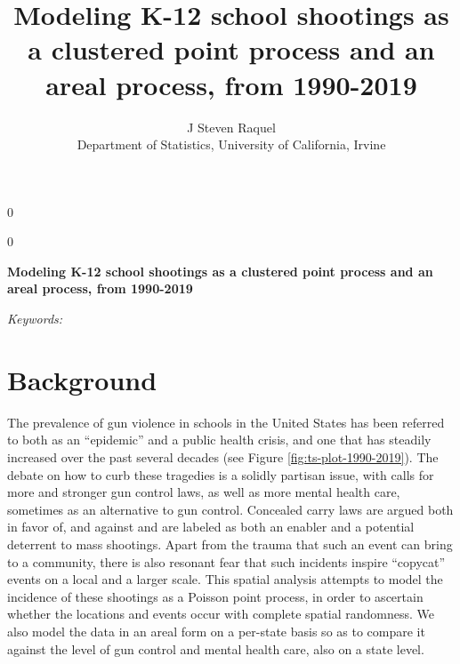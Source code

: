 \documentclass[12pt]{article}
\newcommand{\blind}{0}
\begin{document}
\def\spacingset#1{\renewcommand{\baselinestretch}%
{#1}\small\normalsize} \spacingset{1}



\blind
{
  \title{\bf Modeling K-12 school shootings as a clustered point process and an areal process, from 1990-2019}

  \author{
        J Steven Raquel \\
    Department of Statistics, University of California, Irvine\\
      }
  \maketitle
} \fi

\blind
{
  \bigskip
  \bigskip
  \bigskip
  \begin{center}
    {\LARGE\bf Modeling K-12 school shootings as a clustered point process and an areal process, from 1990-2019}
  \end{center}
  \medskip
} \fi

\bigskip
\begin{abstract}

\end{abstract}

\noindent%
{\it Keywords:} 
\vfill

\newpage
\spacingset{1.45} %

\hypertarget{background}{%
\section{Background}\label{background}}

The prevalence of gun violence in schools in the United States has been referred to both as an ``epidemic'' and a public health crisis, and one that has steadily increased over the past several decades (see Figure \ref{fig:ts-plot-1990-2019}). The debate on how to curb these tragedies is a solidly partisan issue, with calls for more and stronger gun control laws, as well as more mental health care, sometimes as an alternative to gun control. Concealed carry laws are argued both in favor of, and against and are labeled as both an enabler and a potential deterrent to mass shootings. Apart from the trauma that such an event can bring to a community, there is also resonant fear that such incidents inspire ``copycat'' events on a local and a larger scale. This spatial analysis attempts to model the incidence of these shootings as a Poisson point process, in order to ascertain whether the locations and events occur with complete spatial randomness. We also model the data in an areal form on a per-state basis so as to compare it against the level of gun control and mental health care, also on a state level.
\end{document}
